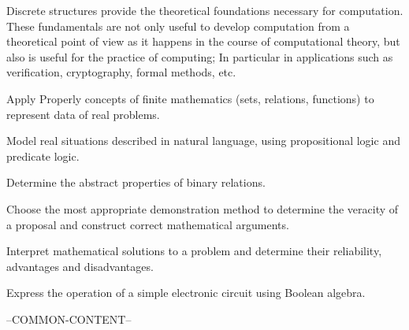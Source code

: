 \begin{syllabus}


\begin{justification}

Discrete structures provide the theoretical foundations necessary for computation. These fundamentals are not only useful to develop computation from a theoretical point of view as it happens 
in the course of computational theory, but also is useful for the practice of computing; In particular in applications such as verification,
cryptography, formal methods, etc.

\end{justification}

\begin{goals}
    \item Apply Properly concepts of finite mathematics (sets, relations, functions) to represent data of real problems.
    \item Model real situations described in natural language, using propositional logic and predicate logic.
    \item Determine the abstract properties of binary relations.
    \item Choose the most appropriate demonstration method to determine the veracity of a proposal and construct correct mathematical arguments.
    \item Interpret mathematical solutions to a problem and determine their reliability, advantages and disadvantages.
    \item Express the operation of a simple electronic circuit using Boolean algebra.
\end{goals}

--COMMON-CONTENT--


\end{syllabus}
